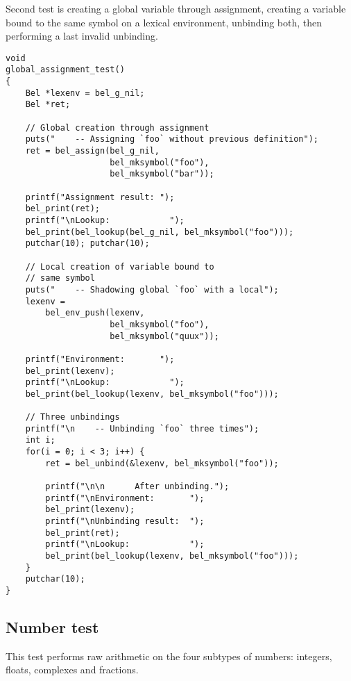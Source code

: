 \documentclass[openright,a4paper,twoside,12pt]{memoir}
\begin{document}
Second test is creating a global variable through assignment, creating
a variable bound to the same symbol on a lexical environment,
unbinding both, then performing a last invalid unbinding.

\begin{verbatim}
void
global_assignment_test()
{
    Bel *lexenv = bel_g_nil;
    Bel *ret;

    // Global creation through assignment
    puts("    -- Assigning `foo` without previous definition");
    ret = bel_assign(bel_g_nil,
                     bel_mksymbol("foo"),
                     bel_mksymbol("bar"));

    printf("Assignment result: ");
    bel_print(ret);
    printf("\nLookup:            ");
    bel_print(bel_lookup(bel_g_nil, bel_mksymbol("foo")));
    putchar(10); putchar(10);

    // Local creation of variable bound to
    // same symbol
    puts("    -- Shadowing global `foo` with a local");
    lexenv =
        bel_env_push(lexenv,
                     bel_mksymbol("foo"),
                     bel_mksymbol("quux"));

    printf("Environment:       ");
    bel_print(lexenv);
    printf("\nLookup:            ");
    bel_print(bel_lookup(lexenv, bel_mksymbol("foo")));

    // Three unbindings
    printf("\n    -- Unbinding `foo` three times");
    int i;
    for(i = 0; i < 3; i++) {
        ret = bel_unbind(&lexenv, bel_mksymbol("foo"));

        printf("\n\n      After unbinding.");
        printf("\nEnvironment:       ");
        bel_print(lexenv);
        printf("\nUnbinding result:  ");
        bel_print(ret);
        printf("\nLookup:            ");
        bel_print(bel_lookup(lexenv, bel_mksymbol("foo")));
    }
    putchar(10);
}
\end{verbatim}

\subsection{Number test}
\label{sec:org215b29e}

This test performs raw arithmetic on the four subtypes of numbers:
integers, floats, complexes and fractions.
\end{document}
